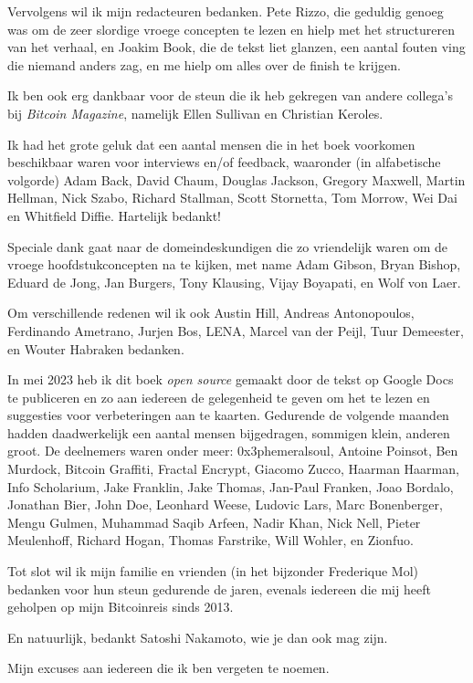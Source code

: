 \documentclass[
  a5paper,
  smalldemyvopaper,11pt,twoside,onecolumn,openright,extrafontsizes,
hidelinks]{memoir}
\begin{document}
Vervolgens wil ik mijn redacteuren bedanken. Pete Rizzo, die geduldig
genoeg was om de zeer slordige vroege concepten te lezen en hielp met
het structureren van het verhaal, en Joakim Book, die de tekst liet
glanzen, een aantal fouten ving die niemand anders zag, en me hielp om
alles over de finish te krijgen.

Ik ben ook erg dankbaar voor de steun die ik heb gekregen van andere
collega's bij \emph{Bitcoin Magazine}, namelijk Ellen Sullivan en
Christian Keroles.

Ik had het grote geluk dat een aantal mensen die in het boek voorkomen
beschikbaar waren voor interviews en/of feedback, waaronder (in
alfabetische volgorde) Adam Back, David Chaum, Douglas Jackson, Gregory
Maxwell, Martin Hellman, Nick Szabo, Richard Stallman, Scott Stornetta,
Tom Morrow, Wei Dai en Whitfield Diffie. Hartelijk bedankt!

Speciale dank gaat naar de domeindeskundigen die zo vriendelijk waren om
de vroege hoofdstukconcepten na te kijken, met name Adam Gibson, Bryan
Bishop, Eduard de Jong, Jan Burgers, Tony Klausing, Vijay Boyapati, en
Wolf von Laer.

Om verschillende redenen wil ik ook Austin Hill, Andreas Antonopoulos,
Ferdinando Ametrano, Jurjen Bos, LENA, Marcel van der Peijl, Tuur
Demeester, en Wouter Habraken bedanken.

In mei 2023 heb ik dit boek \emph{open source} gemaakt door de tekst op
Google Docs te publiceren en zo aan iedereen de gelegenheid te geven om
het te lezen en suggesties voor verbeteringen aan te kaarten. Gedurende
de volgende maanden hadden daadwerkelijk een aantal mensen bijgedragen,
sommigen klein, anderen groot. De deelnemers waren onder meer:
0x3phemeralsoul, Antoine Poinsot, Ben Murdock, Bitcoin Graffiti, Fractal
Encrypt, Giacomo Zucco, Haarman Haarman, Info Scholarium, Jake Franklin,
Jake Thomas, Jan-Paul Franken, Joao Bordalo, Jonathan Bier, John Doe,
Leonhard Weese, Ludovic Lars, Marc Bonenberger, Mengu Gulmen, Muhammad
Saqib Arfeen, Nadir Khan, Nick Nell, Pieter Meulenhoff, Richard Hogan,
Thomas Farstrike, Will Wohler, en Zionfuo.

Tot slot wil ik mijn familie en vrienden (in het bijzonder Frederique
Mol) bedanken voor hun steun gedurende de jaren, evenals iedereen die
mij heeft geholpen op mijn Bitcoinreis sinds 2013.

En natuurlijk, bedankt Satoshi Nakamoto, wie je dan ook mag zijn.

Mijn excuses aan iedereen die ik ben vergeten te noemen.
\end{document}
